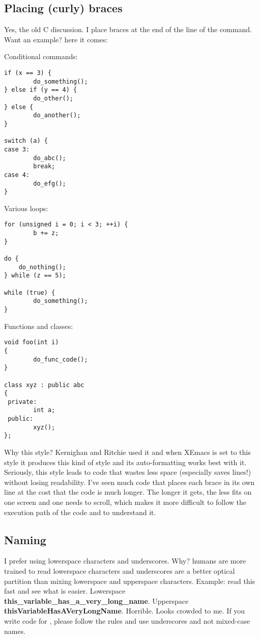 \documentclass{report}
\begin{document}
\subsection{Placing (curly) braces}

Yes, the old C discussion. I place braces at the end of the line of the
command. Want an example? here it comes:
    
Conditional commands:
    
\begin{verbatim}
if (x == 3) {
        do_something();
} else if (y == 4) {
        do_other();
} else {
        do_another();
}

switch (a) {
case 3:
        do_abc();
        break;
case 4:
        do_efg();
}
\end{verbatim}

    Various loops:
    
    \begin{verbatim}
for (unsigned i = 0; i < 3; ++i) {
        b += z;
}

do {
    do_nothing();
} while (z == 5);

while (true) {
        do_something();
}
\end{verbatim}

    Functions and classes:
    
    \begin{verbatim}
void foo(int i)
{
        do_func_code();
}

class xyz : public abc
{
 private:
        int a;
 public:
        xyz();
};
\end{verbatim}

    Why this style? Kernighan and Ritchie used it and when XEmacs is set
    to this style it produces this kind of style and its auto-formatting
    works best with it. Seriously, this style leads to code that wastes
    less space (especially saves lines!) without losing readability.
    I've seen much code that places each brace in its own line at the
    cost that the code is much longer. The longer it gets, the less fits
    on one screen and one needs to scroll, which makes it more difficult
    to follow the execution path of the code and to understand it.
    

    \subsection{Naming}

    I prefer using lowerspace characters and underscores. Why? humans
    are more trained to read lowerspace characters and underscores are a
    better optical partition than mixing lowerspace and upperspace
    characters. Example: read this fast and see what is easier.
    Lowerspace \textbf{this\_variable\_has\_a\_very\_long\_name}.
    Upperspace \textbf{thisVariableHasAVeryLongName}. Horrible. Looks
    crowded to me. If you write code for \dftd, please follow the rules
    and use underscores and not mixed-case names.
    
\end{document}
